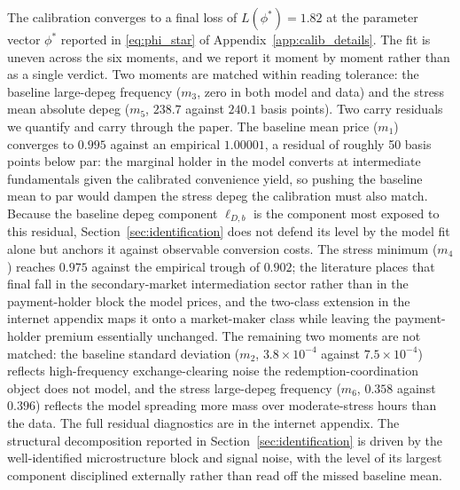 The calibration converges to a final loss of $L(\phi^*) = 1.82$ at the parameter vector $\phi^*$ reported in \eqref{eq:phi_star} of Appendix~\ref{app:calib_details}. The fit is uneven across the six moments, and we report it moment by moment rather than as a single verdict. Two moments are matched within reading tolerance: the baseline large-depeg frequency ($m_3$, zero in both model and data) and the stress mean absolute depeg ($m_5$, $238.7$ against $240.1$ basis points). Two carry residuals we quantify and carry through the paper. The baseline mean price ($m_1$) converges to $0.995$ against an empirical $1.00001$, a residual of roughly 50 basis points below par: the marginal holder in the model converts at intermediate fundamentals given the calibrated convenience yield, so pushing the baseline mean to par would dampen the stress depeg the calibration must also match. Because the baseline depeg component $\ell_{D,b}$ is the component most exposed to this residual, Section~\ref{sec:identification} does not defend its level by the model fit alone but anchors it against observable conversion costs. The stress minimum ($m_4$) reaches $0.975$ against the empirical trough of $0.902$; the literature places that final fall in the secondary-market intermediation sector rather than in the payment-holder block the model prices, and the two-class extension in the internet appendix maps it onto a market-maker class while leaving the payment-holder premium essentially unchanged. The remaining two moments are not matched: the baseline standard deviation ($m_2$, $3.8 \times 10^{-4}$ against $7.5 \times 10^{-4}$) reflects high-frequency exchange-clearing noise the redemption-coordination object does not model, and the stress large-depeg frequency ($m_6$, $0.358$ against $0.396$) reflects the model spreading more mass over moderate-stress hours than the data. The full residual diagnostics are in the internet appendix. The structural decomposition reported in Section~\ref{sec:identification} is driven by the well-identified microstructure block and signal noise, with the level of its largest component disciplined externally rather than read off the missed baseline mean.

